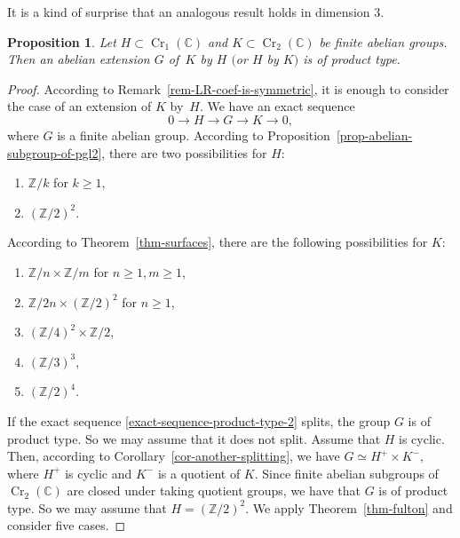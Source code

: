 \documentclass[11pt]{amsart}
\numberwithin{equation}{section}
\newtheorem{proposition}[thm]{Proposition}
\theoremstyle{definition}
\theoremstyle{remark}
\newcommand{\lra}{\longrightarrow}
\DeclareMathOperator{\Cr}{Cr}
\begin{document}
It is a kind of surprise that an analogous result holds in dimension $3$.

\begin{proposition}
\label{prop-abstact-extension}
Let $H\subset \Cr_1(\mathbb{C})$ and $K\subset \Cr_2(\mathbb{C})$ be finite abelian groups. Then an abelian extension $G$ of\, $K$ by $H$ $($or $H$ by $K)$ is of product type.
\end{proposition}

\begin{proof}
According to Remark~\ref{rem-LR-coef-is-symmetric}, it is enough to consider the case of an extension of $K$ by~$H$. 
We have an exact sequence
\begin{equation}
\label{exact-sequence-product-type-2}
0\lra H \lra G \lra K \lra 0, 
\end{equation}
where $G$ is a finite abelian group. 
According to Proposition~\ref{prop-abelian-subgroup-of-pgl2}, there are two possibilities for $H$: 
\begin{enumerate}
\item
$\mathbb{Z}/k$ for $k\geq 1$, 
\item
$(\mathbb{Z}/2)^2$. 
\end{enumerate}
According to Theorem~\ref{thm-surfaces}, there are the following possibilities for $K$:
\begin{enumerate}
\item\label{K1}
$\mathbb{Z}/n\times \mathbb{Z}/m$ for $n\geq
1, m\geq 1$,

\item\label{K2}
$\mathbb{Z}/2n\times (\mathbb{Z}/2)^2$ for $n\geq 1$,

\item\label{K3}
$(\mathbb{Z}/4)^2\times \mathbb{Z}/2$,

\item\label{K4}
$(\mathbb{Z}/3)^3$,

\item\label{K5}
$(\mathbb{Z}/2)^4$.
\end{enumerate}
If the exact sequence \eqref{exact-sequence-product-type-2} splits, the group $G$ is of product type. So we may assume that it does not split. 
Assume that $H$ is cyclic.
Then, according to Corollary~\ref{cor-another-splitting}, we have $G\simeq H^+\times K^-$, where $H^+$ is cyclic and $K^-$ is a quotient of $K$. Since finite abelian subgroups of $\Cr_2(\mathbb{C})$ are closed under taking quotient groups, we have that $G$ is of product type. 
So we may assume that $H=(\mathbb{Z}/2)^2$. 
We apply Theorem~\ref{thm-fulton} and consider five cases.



\end{proof}
\end{document}
